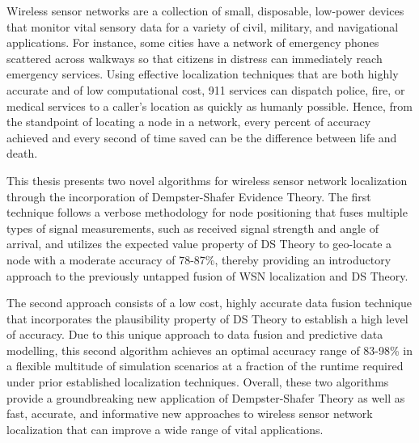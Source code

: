 \documentclass[12pt]{uthesis-v12}  %
\begin{document}

\begin{abstractpage}
Wireless sensor networks are a collection of small, disposable, low-power devices that monitor vital sensory data for a variety of civil, military, and navigational applications. For instance, some cities have a network of emergency phones scattered across walkways so that citizens in distress can immediately reach emergency services. Using effective localization techniques that are both highly accurate and of low computational cost, 911 services can dispatch police, fire, or medical services to a caller's location as quickly as humanly possible. Hence, from the standpoint of locating a node in a network, every percent of accuracy achieved and every second of time saved can be the difference between life and death.

This thesis presents two novel algorithms for wireless sensor network localization through the incorporation of Dempster-Shafer Evidence Theory. The first technique follows a verbose methodology for node positioning that fuses multiple types of signal measurements, such as received signal strength and angle of arrival, and utilizes the expected value property of DS Theory to geo-locate a node with a moderate accuracy of 78-87\%, thereby providing an introductory approach to the previously untapped fusion of WSN localization and DS Theory. 

The second approach consists of a low cost, highly accurate data fusion technique that incorporates the plausibility property of DS Theory to establish a high level of accuracy. Due to this unique approach to data fusion and predictive data modelling, this second algorithm achieves an optimal accuracy range of 83-98\% in a flexible multitude of simulation scenarios at a fraction of the runtime required under prior established localization techniques. Overall, these two algorithms provide a groundbreaking new application of Dempster-Shafer Theory as well as fast, accurate, and informative new approaches to wireless sensor network localization that can improve a wide range of vital applications.
\end{abstractpage}
\end{document}

